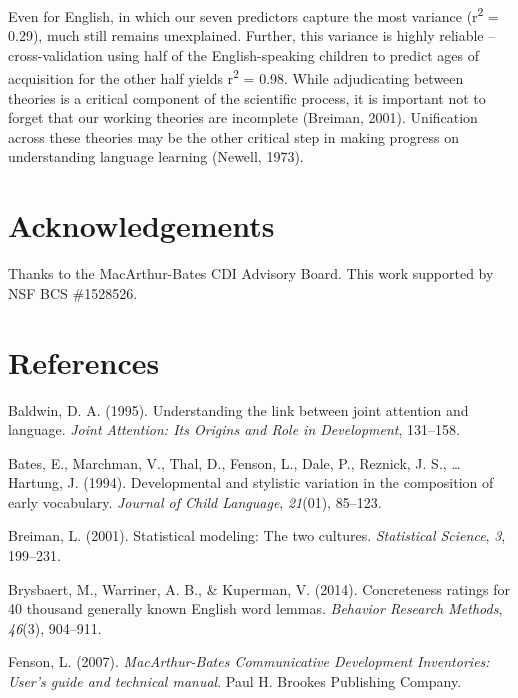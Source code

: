 \documentclass[10pt, letterpaper]{article}
\begin{document}
Even for English, in which our seven predictors capture the most
variance (r\textsuperscript{2} = 0.29), much still remains unexplained.
Further, this variance is highly reliable -- cross-validation using half
of the English-speaking children to predict ages of acquisition for the
other half yields r\textsuperscript{2} = 0.98. While adjudicating
between theories is a critical component of the scientific process, it
is important not to forget that our working theories are incomplete
(Breiman, 2001). Unification across these theories may be the other
critical step in making progress on understanding language learning
(Newell, 1973).

\vspace{1em}


\section{Acknowledgements}\label{acknowledgements}

Thanks to the MacArthur-Bates CDI Advisory Board. This work supported by
NSF BCS \#1528526.

\section{References}\label{references}

\setlength{\parindent}{-0.1in} \setlength{\leftskip}{0.125in} \noindent

Baldwin, D. A. (1995). Understanding the link between joint attention
and language. \emph{Joint Attention: Its Origins and Role in
Development}, 131--158.

Bates, E., Marchman, V., Thal, D., Fenson, L., Dale, P., Reznick, J. S.,
\ldots{} Hartung, J. (1994). Developmental and stylistic variation in
the composition of early vocabulary. \emph{Journal of Child Language},
\emph{21}(01), 85--123.

Breiman, L. (2001). Statistical modeling: The two cultures.
\emph{Statistical Science}, \emph{3}, 199--231.

Brysbaert, M., Warriner, A. B., \& Kuperman, V. (2014). Concreteness
ratings for 40 thousand generally known English word lemmas.
\emph{Behavior Research Methods}, \emph{46}(3), 904--911.

Fenson, L. (2007). \emph{MacArthur-Bates Communicative Development
Inventories: User's guide and technical manual}. Paul H. Brookes
Publishing Company.
\end{document}

